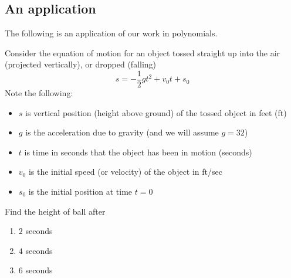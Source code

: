 \subsection{An application}
The following is an application of our work in polynomials.
\begin{myexample}\label{ex:fallingobject}
Consider the \gls{equation} of motion for an object tossed straight up into the air (projected vertically), 
or dropped (falling)
\begin{equation}\label{eq:objectfalling}
	s = -\frac{1}{2}gt^2+v_0t+s_0
\end{equation}
Note the following:
\begin{itemize}
	\item $s$ is vertical position (height above ground) of the tossed object in feet (ft)
	\item $g$ is the acceleration due to gravity (and we will assume $g=32$)
	\item $t$ is time in seconds that the object has been in motion (seconds)
	\item $v_0$ is the initial speed (or velocity) of the object in ft/sec
	\item $s_0$ is the initial position at time $t=0$
\end{itemize} 
Find the height of ball after
\begin{multicols}{3}
	\begin{enumerate}
		\item $2$ seconds
		\item $4$ seconds
		\item $6$ seconds
	\end{enumerate} 
\end{multicols} 
\end{myexample}
